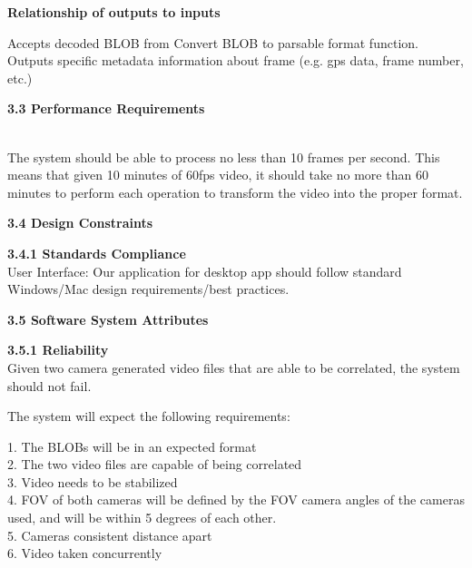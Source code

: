 \documentclass[10pt,draftclsnofoot,onecolumn]{IEEEtran}
\begin{document}
 \vspace{5mm}
\textbf{Relationship of outputs to inputs }\\
 \vspace{5mm}

Accepts decoded BLOB from Convert BLOB to parsable format function. Outputs specific metadata information about frame (e.g. gps data, frame number, etc.)
 \\\vspace{5mm}
 
 
 {\Medium\textbf{3.3 Performance Requirements}} \\
  \\\vspace{5mm}

The system should be able to process no less than 10 frames per second. This means that given 10 minutes of 60fps video, it should take no more than 60 minutes to perform each operation to transform the video into the proper format.
  \\\vspace{5mm}

 {\Medium\textbf{3.4 Design Constraints}} \\
   \vspace{5mm}

 {\Medium\textbf{3.4.1 Standards Compliance}} \\
   \vspace{5mm}
   User Interface: Our application for  desktop app should follow standard Windows/Mac design requirements/best practices.
   \vspace{5mm}

 {\Medium\textbf{3.5 Software System Attributes}} \\
    \vspace{5mm}

 {\Medium\textbf{3.5.1 Reliability}} \\
Given two camera generated video files that are able to be correlated, the system should not fail.\\
 \vspace{2mm}

The system will expect the following requirements:\\
\vspace{2mm}

1. The BLOBs will be in an expected format\\
2. The two video files are capable of being correlated\\
3. Video needs to be stabilized\\
4. FOV of both cameras will be defined by the FOV camera angles of the cameras used, and will be within 5 degrees of each other. \\
5. Cameras consistent distance apart\\
6. Video taken concurrently\\
\end{document}
